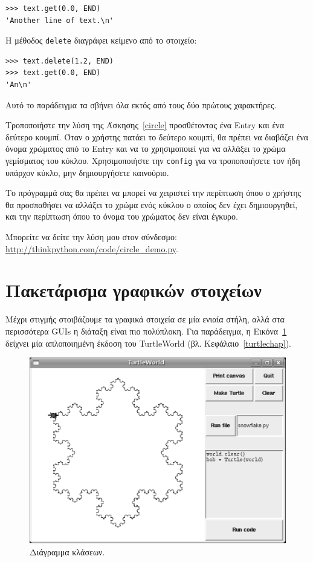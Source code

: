 \documentclass[10pt]{book}
\begin{document}
\begin{verbatim}
>>> text.get(0.0, END)
'Another line of text.\n'
\end{verbatim}
%
Η μέθοδος {\tt delete} διαγράφει κείμενο από το στοιχείο:  

\begin{verbatim}
>>> text.delete(1.2, END)
>>> text.get(0.0, END)
'An\n'
\end{verbatim}

Αυτό το παράδειγμα τα σβήνει όλα εκτός από τους δύο πρώτους χαρακτήρες.
\\
%

\begin{exercise}
\label{circle2}

Τροποποιήστε την λύση της Άσκησης~\ref{circle} προσθέτοντας ένα Entry  
και ένα δεύτερο κουμπί.  Όταν ο χρήστης πατάει το δεύτερο κουμπί, θα πρέπει να διαβάζει 
ένα όνομα χρώματος από το Entry και να το χρησιμοποιεί για να αλλάξει το χρώμα γεμίσματος 
του κύκλου.  Χρησιμοποιήστε την {\tt config} για να τροποποιήσετε τον ήδη υπάρχον 
κύκλο, μην δημιουργήσετε καινούριο.

Το πρόγραμμά σας θα πρέπει να μπορεί να χειριστεί την περίπτωση όπου ο χρήστης θα προσπαθήσει 
να αλλάξει το χρώμα ενός κύκλου ο οποίος δεν έχει δημιουργηθεί, και την περίπτωση όπου το όνομα
του χρώματος δεν είναι έγκυρο.

Μπορείτε να δείτε την λύση μου στον σύνδεσμο:
\url{http://thinkpython.com/code/circle_demo.py}.
\end{exercise}


 
\section{Πακετάρισμα γραφικών στοιχείων}

Μέχρι στιγμής στοιβάζουμε τα γραφικά στοιχεία σε μία ενιαία στήλη, αλλά στα περισσότερα
GUIs η διάταξη είναι πιο πολύπλοκη.  Για παράδειγμα, η Εικόνα~\ref{fig.turtleworld} δείχνει
μία απλοποιημένη έκδοση του TurtleWorld (βλ. Κεφάλαιο~\ref{turtlechap}).

\begin{figure}
\centerline{\includegraphics[scale=0.5]{figs/TurtleWorld.pdf}}
 \caption{Διάγραμμα κλάσεων.} 
\label{fig.turtleworld}
\end{figure}
\end{document}
